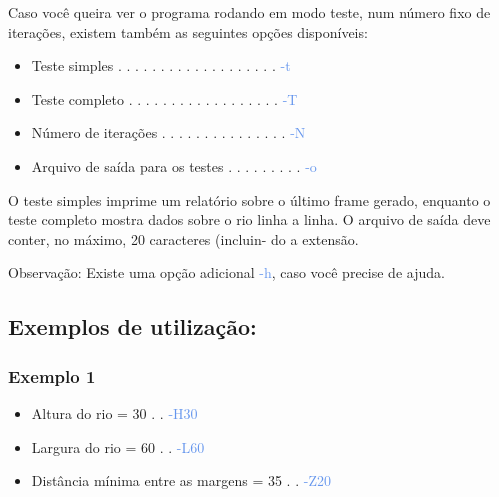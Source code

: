 \documentclass[a4paper,12pt]{article}
\begin{document}
  Caso você queira ver o programa rodando em modo teste, num número fixo de
  iterações, existem também as seguintes opções disponíveis:
  
  \bigskip
  \begin{itemize}
  
  \item Teste simples  . . . . . . . . . . . . . . . . . . .   \textcolor{CornflowerBlue}{-t}
  \item Teste completo . . . . . . . . . . . . . . . . . .  \textcolor{CornflowerBlue}{-T}
  \item Número de iterações  . . . . . . . . . . . . . . .  \textcolor{CornflowerBlue}{-N}
  \item Arquivo de saída para os testes  . . . . . . . . .  \textcolor{CornflowerBlue}{-o} 
  
  \end{itemize}
  \bigskip
  
  O teste simples imprime um relatório sobre o último frame gerado,
  enquanto o teste completo mostra dados sobre o rio linha a linha. 
  O arquivo de saída deve conter, no máximo, 20 caracteres (incluin-
  do a extensão.
  
  \bigskip
  \bigskip
  \bigskip
  
  Observação: Existe uma opção adicional \textcolor{CornflowerBlue}{-h}, 
  caso você precise de ajuda.
  
  \newpage %
  \subsection{\textcolor{NavyBlue}{Exemplos de utilização:}}
  \bigskip
  
    \subsubsection{\textcolor{NavyBlue}{Exemplo 1}}
    \bigskip
    \begin{itemize}
  
    \item Altura do rio = 30  . . \textcolor{CornflowerBlue}{-H30}
    \item Largura do rio = 60  . . \textcolor{CornflowerBlue}{-L60}  
    \item Distância mínima entre as margens = 35  . . \textcolor{CornflowerBlue}{-Z20}
    
    \end{itemize}  
    \bigskip
    
\end{document}
